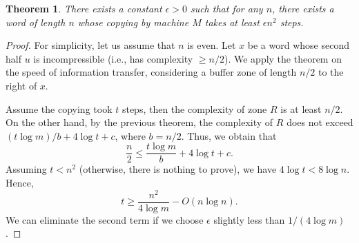 \documentclass[12pt,sans]{article}
\theoremstyle{definition}
\theoremstyle{plain}
\newtheorem{theorem}{Theorem}[section]
\theoremstyle{remark}
\begin{document}
\begin{theorem}
    There exists a constant $\epsilon > 0$ such that for any $n$, there exists a word of length $n$ whose copying by machine $M$ takes at least $\epsilon n^2$ steps.
\end{theorem}
\begin{proof}
    For simplicity, let us assume that $n$ is even. Let $x$ be a word whose second half $u$ is incompressible (i.e., has complexity $\ge n/2$). We apply the theorem on the speed of information transfer, considering a buffer zone of length $n/2$ to the right of $x$.
    \begin{center}
    \end{center}

    Assume the copying took $t$ steps, then the complexity of zone $R$ is at least $n/2$. On the other hand, by the previous theorem, the complexity of $R$ does not exceed $(t\log m)/b + 4\log t + c$, where $b = n/2$. Thus, we obtain that
    \[
    \frac{n}{2} \le \frac{t\log m}{b} + 4\log t + c.
    \]
    Assuming $t < n^2$ (otherwise, there is nothing to prove), we have $4\log t < 8\log n$. Hence,
    \[
    t \ge \frac{n^2}{4\log m} - O(n\log n).
    \]
    We can eliminate the second term if we choose $\epsilon$ slightly less than $1/(4\log m)$.
\end{proof}
\end{document}
